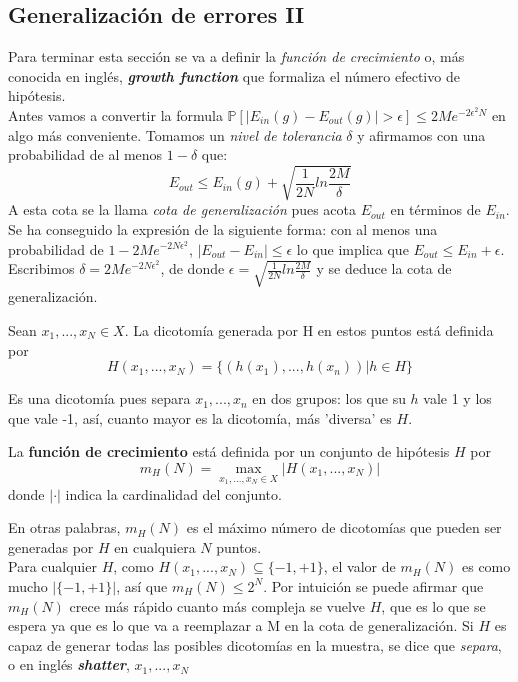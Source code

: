 \subsection{Generalización de errores II}
Para terminar esta sección se va a definir la \textit{función de crecimiento} o, más conocida en inglés, \textbf{\textit{growth function}} que formaliza el número efectivo de hipótesis.\\
Antes vamos a convertir la formula $\mathbb{P}[\vert E_{in}(g)-E_{out}(g) \vert > \epsilon] \leq 2Me^{-2\epsilon^{2}N}$ en algo más conveniente. Tomamos un \textit{nivel de tolerancia} $\delta$ y afirmamos con una probabilidad de al menos $1 - \delta$ que:
\[ E_{out} \leq E_{in}(g) + \sqrt{\frac{1}{2N} ln \frac{2M}{\delta}} \] 
A esta cota se la llama \textit{cota de generalización} pues acota $E_{out}$ en términos de $E_{in}$. Se ha conseguido la expresión de la siguiente forma: con al menos una probabilidad de $1 - 2Me^{-2N \epsilon^{2}}$, $\vert E_{out} - E_{in} \vert \leq \epsilon $ lo que implica que $E_{out} \leq E_{in} + \epsilon$. Escribimos $\delta = 2Me^{-2N\epsilon^{2}}$, de donde $\epsilon=\sqrt{\frac{1}{2N}ln\frac{2M}{\delta}}$ y se deduce la cota de generalización.
\begin{definicion}
Sean $x_{1},...,x_{N} \in X$. La dicotomía generada por H en estos puntos está definida por  \[ H(x_{1},...,x_{N})= \lbrace (h(x_{1}),...,h(x_{n})) \vert h \in H \rbrace \]
\end{definicion}
Es una dicotomía pues separa $x_{1},...,x_{n}$ en dos grupos: los que su $h$ vale 1 y los que vale -1, así, cuanto mayor es la dicotomía, más 'diversa' es $H$.
\begin{definicion}
La \textbf{función de crecimiento} está definida por un conjunto de hipótesis $H$ por \[ m_{H}(N)=\max_{x_{1},...,x_{N} \in X} \vert H(x_{1},...,x_{N}) \vert \]
donde $\vert \cdot \vert$ indica la cardinalidad del conjunto.
\end{definicion}
En otras palabras, $m_{H}(N)$ es el máximo número de dicotomías que pueden ser generadas por $H$ en cualquiera $N$ puntos.\\
Para cualquier $H$, como $H(x_{1},...,x_{N}) \subseteq \lbrace -1,+1 \rbrace$, el valor de $m_{H}(N)$ es como mucho $\vert \lbrace -1,+1 \rbrace \vert$, así que $m_{H}(N) \leq 2^{N}$. Por intuición se puede afirmar que $m_{H}(N)$ crece más rápido cuanto más compleja se vuelve $H$, que es lo que se espera ya que es lo que va a reemplazar a M en la cota de generalización. Si $H$ es capaz de generar todas las posibles dicotomías en la muestra, se dice que \textit{separa}, o en inglés \textbf{\textit{shatter}}, $x_{1},...,x_{N}$\\
